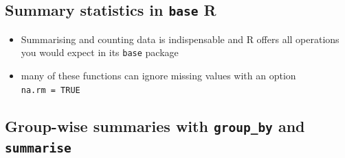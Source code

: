 \documentclass[
  letterpaper,
]{book}
\newenvironment{Shaded}{}{}
\newcommand{\AttributeTok}[1]{\textcolor[rgb]{0.84,0.23,0.29}{#1}}
\newcommand{\CommentTok}[1]{\textcolor[rgb]{0.42,0.45,0.49}{#1}}
\newcommand{\FloatTok}[1]{\textcolor[rgb]{0.00,0.36,0.77}{#1}}
\newcommand{\FunctionTok}[1]{\textcolor[rgb]{0.44,0.26,0.76}{#1}}
\newcommand{\NormalTok}[1]{\textcolor[rgb]{0.14,0.16,0.18}{#1}}
\newcommand{\SpecialCharTok}[1]{\textcolor[rgb]{0.00,0.36,0.77}{#1}}
\begin{document}
\hypertarget{summary-statistics-in-base-r}{%
\subsection{\texorpdfstring{Summary statistics in \texttt{base}
R}{Summary statistics in base R}}\label{summary-statistics-in-base-r}}

\begin{itemize}
\item
  Summarising and counting data is indispensable and R offers all
  operations you would expect in its \texttt{base} package

\begin{Shaded}
\end{Shaded}
\item
  many of these functions can ignore missing values with an option
  \texttt{na.rm\ =\ TRUE}
\end{itemize}

\hypertarget{group-wise-summaries-with-group_by-and-summarise}{%
\subsection{\texorpdfstring{Group-wise summaries with \texttt{group\_by}
and
\texttt{summarise}}{Group-wise summaries with group\_by and summarise}}\label{group-wise-summaries-with-group_by-and-summarise}}
\end{document}
